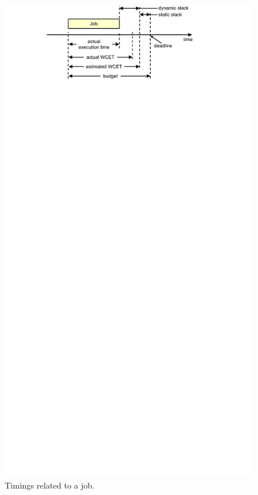 \begin{figure}
  \begin{center}
    \includegraphics{figs/timings.pdf}
    \caption{Timings related to a job.}
    \label{fig:background.rts.timings}
  \end{center}
\end{figure}

